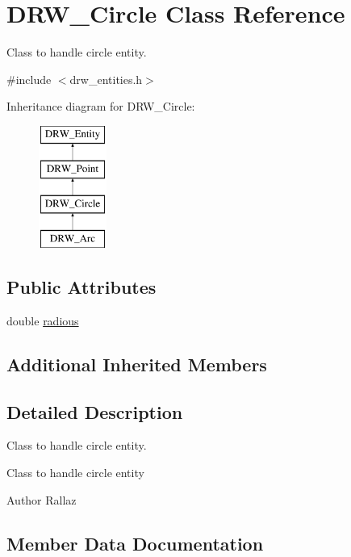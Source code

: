 \hypertarget{class_d_r_w___circle}{}\section{D\+R\+W\+\_\+\+Circle Class Reference}
\label{class_d_r_w___circle}


Class to handle circle entity.  




{\ttfamily \#include $<$drw\+\_\+entities.\+h$>$}

Inheritance diagram for D\+R\+W\+\_\+\+Circle\+:\begin{figure}[H]
\begin{center}
\leavevmode
\includegraphics[height=4.000000cm]{de/dff/class_d_r_w___circle}
\end{center}
\end{figure}
\subsection*{Public Attributes}
\begin{DoxyCompactItemize}
\item 
double \hyperlink{class_d_r_w___circle_ab431594544fbe949dd44cbb79e1a7237}{radious}
\end{DoxyCompactItemize}
\subsection*{Additional Inherited Members}


\subsection{Detailed Description}
Class to handle circle entity. 

Class to handle circle entity \begin{DoxyAuthor}{Author}
Rallaz 
\end{DoxyAuthor}


\subsection{Member Data Documentation}
\hypertarget{class_d_r_w___circle_ab431594544fbe949dd44cbb79e1a7237}{}

